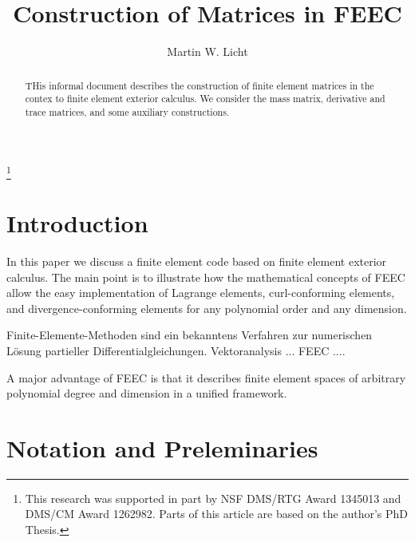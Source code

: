 \documentclass[letterpaper,10pt,draft]{amsart}
\begin{document}
\title
[Bases FEEC]
{Construction of Matrices in FEEC}

\author{Martin W. Licht}

\address{UCSD Department of Mathematics, 9500 Gilman Drive MC0112, La Jolla, CA 92093-0112, USA}


\thanks{
This research was supported in part by NSF DMS/RTG Award 1345013 and DMS/CM Award 1262982.
Parts of this article are based on the author's PhD Thesis.}




\begin{abstract}
 THis informal document describes the construction of finite element matrices 
 in the contex to finite element exterior calculus.
 We consider the mass matrix, derivative and trace matrices,
 and some auxiliary constructions.
\end{abstract}

\maketitle 

\section{Introduction} \label{sec:introduction}

In this paper we discuss a finite element code 
based on finite element exterior calculus. 
The main point is to illustrate how the mathematical concepts of FEEC 
allow the easy implementation of Lagrange elements, curl-conforming elements, and divergence-conforming elements 
for any polynomial order and any dimension. 

Finite-Elemente-Methoden sind ein bekanntens Verfahren zur numerischen Lösung partieller Differentialgleichungen.
Vektoranalysis ... 
FEEC .... 

A major advantage of FEEC is that it describes finite element spaces 
of arbitrary polynomial degree and dimension 
in a unified framework. 

\section{Notation and Preleminaries}
\end{document}
